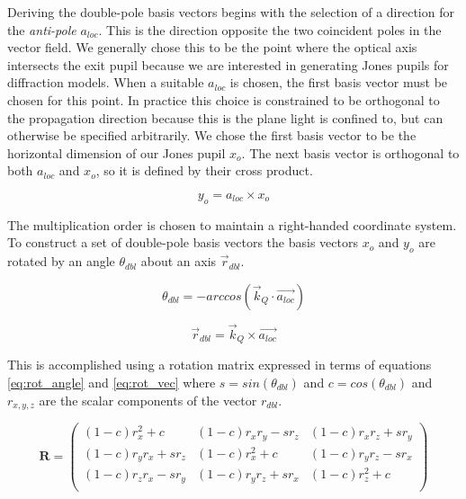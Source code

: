 Deriving the double-pole basis vectors begins with the selection of a direction for the \emph{anti-pole} $a_{loc}$. This is the direction opposite the two coincident poles in the vector field. We generally chose this to be the point where the optical axis intersects the exit pupil because we are interested in generating Jones pupils for diffraction models. When a suitable $a_{loc}$ is chosen, the first basis vector must be chosen for this point. In practice this choice is constrained to be orthogonal to the propagation direction because this is the plane light is confined to, but can otherwise be specified arbitrarily. We chose the first basis vector to be the horizontal dimension of our Jones pupil $x_{o}$. The next basis vector is orthogonal to both $a_{loc}$ and $x_{o}$, so it is defined by their cross product.

\begin{equation}
	y_{o} = a_{loc} \times x_{o}
\end{equation}

The multiplication order is chosen to maintain a right-handed coordinate system. To construct a set of double-pole basis vectors the basis vectors $x_{o}$ and $y_{o}$ are rotated by an angle $\theta_{dbl}$ about an axis $\vec{r}_{dbl}$.

\begin{equation}
	\theta_{dbl} = -arccos(\vec{k}_{Q} \cdot \vec{a_{loc}})
	\label{eq:rot_angle}
\end{equation}

\begin{equation}
	\vec{r}_{dbl} = \vec{k}_{Q} \times \vec{a_{loc}}
	\label{eq:rot_vec}
\end{equation}

This is accomplished using a rotation matrix expressed in terms of equations \ref{eq:rot_angle} and \ref{eq:rot_vec} where $s = sin(\theta_{dbl})$ and $c = cos(\theta_{dbl})$ and $r_{x,y,z}$ are the scalar components of the vector $r_{dbl}$. 

\begin{equation}
	\mathbf{R} = 
	\begin{pmatrix}
		(1-c)r_{x}^{2} + c & (1-c)r_{x}r_{y} - sr_{z} & (1-c)r_{x}r_{z} + sr_{y} \\
		(1-c)r_{y}r_{x} + sr_{z} & (1-c)r_{x}^{2} + c & (1-c)r_{y}r_{z} - sr_{x}\\
		(1-c)r_{z}r_{x} - sr_{y} & (1-c)r_{y}r_{z} + sr_{x} & (1-c)r_{z}^{2} + c \\
	\end{pmatrix}
\end{equation}

